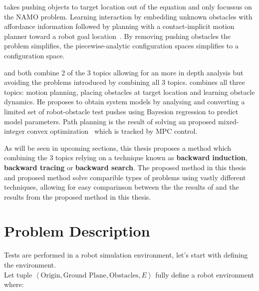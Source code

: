 \citeauthor{wang_affordancebased_2020} takes pushing objects to target location out of the equation and only focussus on the \ac{NAMO} problem. Learning interaction by embedding unknown obstacles with affordance information followed by planning with a contact-implicit motion planner toward a robot goal location~\cite{wang_affordancebased_2020}. By removing pushing obstacles the problem simplifies, the piecewise-analytic configuration spaces simplifies to a configuration space.\bs

\citeauthor{vega-brown_asymptotically_2020} and \citeauthor{wang_affordancebased_2020} both combine 2 of the 3 topics allowing for an more in depth analysis but avoiding the problems introduced by combining all 3 topics. \citeauthor{sabbaghnovin_model_2021} combines all three topics: motion planning, placing obstacles at target location and learning obstacle dynamics. He proposes to obtain system models by analysing and converting a limited set of robot-obstacle test pushes using Bayesion regression to predict model parameters. Path planning is the result of solving an proposed mixed-integer convex optimization~\cite{sabbaghnovin_optimal_2016} which is tracked by \ac{MPC} control.\bs

As will be seen in upcoming sections, this thesis proposes a method which combining the 3 topics relying on a technique known as \textbf{backward induction}, \textbf{backward tracing} or \textbf{backward search}. The proposed method in this thesis and \citeauthor{sabbaghnovin_model_2021} proposed method solve comparible types of problems using vastly different techniques, allowing for easy comparinson between the the results of \citeauthor{sabbaghnovin_optimal_2016} and the results from the proposed method in this thesis.\bs

\section{Problem Description}
Tests are performed in a robot simulation environment, let's start with defining the environment.\\Let tuple $\left\langle \text{Origin}, \text{Ground Plane}, \text{Obstacles}, E \right\rangle$ fully define a robot environment where:\bs

